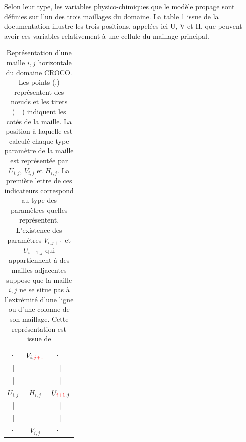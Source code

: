 \documentclass[10pt,a4paper,titlepage]{article}
\begin{document}
Selon leur type, les variables physico-chimiques que le modèle propage sont définies sur l'un des trois maillages du domaine.
La table \ref{structure_maille horizontale} issue de la documentation \cite{grid_doc} illustre les trois positions, appelées ici U, V et H, que peuvent avoir ces variables relativement à une cellule du maillage principal.

\begin{table}[h!]
    \centering
    \begin{tabular}{ c c c }
        \multicolumn{1}{r}{·--} & $V_{i,{\color{red}j+1}}$ & \multicolumn{1}{l}{--·} \\ 
        | & & | \\
        | & & | \\
        $U_{i,j}$ & $H_{i,j}$ & $U_{{\color{red}i+1},j}$ \\  
        | & & | \\
        | & & | \\
        \multicolumn{1}{r}{·--} & \textbf{$V_{i,j}$} & \multicolumn{1}{l}{--·}
    \end{tabular}
    \caption{
        Représentation d'une maille $i,j$ horizontale du domaine CROCO.
        Les points (.) représentent des n\oe{}uds et les tirets (\_|) indiquent les cotés de la maille.
        La position à laquelle est calculé chaque type paramètre de la maille est représentée par $U_{i,j}$, $V_{i,j}$ et $H_{i,j}$.
        La première lettre de ces indicateurs correspond au type des paramètres quelles représentent.
        L'existence des paramètres $V_{i,j+1}$ et $U_{i+1,j}$ qui appartiennent à des mailles adjacentes suppose que la maille $i,j$ ne se situe pas à l'extrémité d'une ligne ou d'une colonne de son maillage.
        Cette représentation est issue de \cite{grid_doc}
    }
    \label{structure_maille horizontale}
\end{table}
\end{document}
